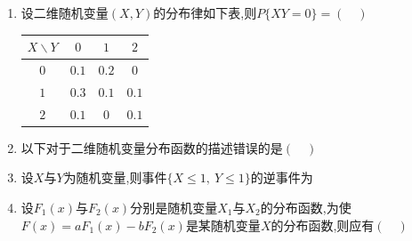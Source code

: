 \begin{enumerate}
  \item 设二维随机变量$(X,Y)$的分布律如下表,则$P\{XY=0\}=(\quad)$
  \begin{table}[htbp]
    \centering
    \begin{tabular}{cccc}
      \toprule
      $X\backslash Y$ & $0$   & $1$   & $2$   \\
      \midrule
      $0$             & $0.1$ & $0.2$ & $0$   \\
      $1$             & $0.3$ & $0.1$ & $0.1$ \\
      $2$             & $0.1$ & $0$   & $0.1$ \\
      \bottomrule
    \end{tabular}
  \end{table}

  \item 以下对于二维随机变量分布函数的描述错误的是$(\quad)$

  \item 设$X$与$Y$为随机变量,则事件$\{X\leqslant 1,\ Y\leqslant 1\}$的逆事件为

  \item 设$F_1(x)$与$F_2(x)$分别是随机变量$X_1$与$X_2$的分布函数,为使$F(x)=aF_1(x)-bF_2(x)$是某随机变量$X$的分布函数,则应有$(\quad)$


\end{enumerate}
